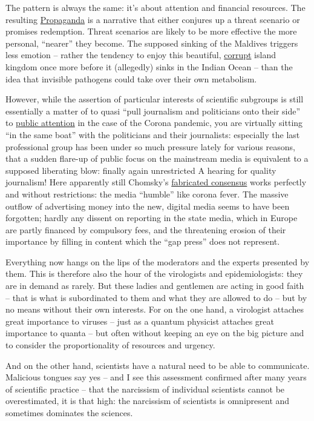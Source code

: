 \documentclass[%
 reprint,
 showpacs,
 showkeys,
 preprintnumbers,
 amsmath,amssymb,
 aps,
  pra,
  longbibliography,
 floatfix,
 ]{revtex4-1}
\begin{document}
The pattern is always the same: it's about attention and financial resources.
The resulting \href{https://www.imdb.com/title/tt0432232/}{Propaganda}
is a narrative that either conjures up a threat scenario or promises redemption.
Threat scenarios are likely to be more effective the more personal, ``nearer'' they become.
The supposed sinking of the Maldives triggers less emotion --
rather the tendency to enjoy this beautiful, \href{https://youtu.be/15N9K3wXh0Y}{corrupt} island kingdom once more before it (allegedly) sinks in the Indian Ocean --
than the idea that invisible pathogens
could take over their own metabolism.

However, while the assertion of particular interests of scientific subgroups is still essentially a matter of
to quasi ``pull journalism and politicians onto their side'' to
\href{http://www.iemar.tuwien.ac.at/publications/Franck_1993a.pdf}{public attention}
in the case of the Corona pandemic, you are virtually sitting ``in the same boat'' with the politicians and their journalists:
especially the last professional group has been under so much pressure lately for various reasons,
that a sudden flare-up of public focus on the mainstream media
is equivalent to a supposed liberating blow: finally again unrestricted
A hearing for quality journalism!
Here apparently still Chomsky's \href{https://youtu.be/EuwmWnphqII}{fabricated consensus} works perfectly and without restrictions: the media ``humble''
like corona fever.
The massive outflow of advertising money into the new, digital media seems to have been forgotten;
hardly any dissent on reporting in the state media, which in Europe are partly financed by compulsory fees,
and the threatening erosion of their importance by filling in content which the ``gap press'' does not represent.

Everything now hangs on the lips of the moderators and the experts presented by them.
This is therefore also the hour of the virologists and epidemiologists:
they are in demand as rarely.
But these ladies and gentlemen are acting in good faith -- that is what is subordinated to them and what they are allowed to do -- but by no means without their own interests.
For on the one hand, a virologist attaches great importance to viruses -- just as a quantum physicist attaches great importance to quanta -- but often without keeping an eye on the big picture
and to consider the proportionality of resources and urgency.



And on the other hand, scientists have a natural need to be able to communicate.
Malicious tongues say yes -- and I see this assessment confirmed after many years of scientific practice --
that the narcissism of individual scientists cannot be overestimated, it is that high: the narcissism of scientists is omnipresent
and sometimes dominates the sciences.
\end{document}
